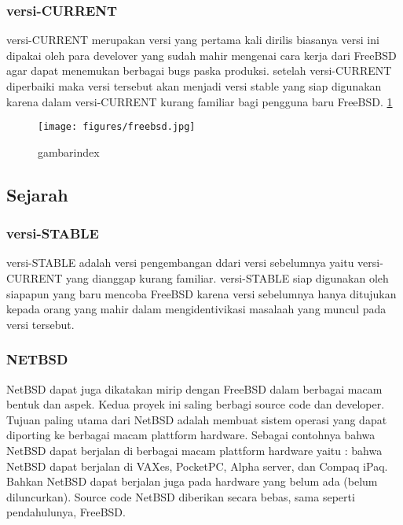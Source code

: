 \subsubsection{versi-CURRENT}
	versi-CURRENT merupakan versi yang pertama kali dirilis biasanya versi ini dipakai oleh para develover yang sudah mahir mengenai
	cara kerja dari FreeBSD agar dapat menemukan berbagai bugs paska produksi. setelah versi-CURRENT diperbaiki maka versi tersebut
	akan menjadi versi stable yang siap digunakan karena dalam versi-CURRENT kurang familiar bagi pengguna baru FreeBSD.
	\ref{freebsd} 
	\begin{figure} [ht]
	\centerline{\texttt{[image: figures/freebsd.jpg]}}
	\caption{gambarindex}
	\label {freebsd}
	\end {figure}
\subsection{Sejarah}
\subsubsection{versi-STABLE}
	versi-STABLE adalah versi pengembangan ddari versi sebelumnya yaitu versi-CURRENT yang dianggap kurang familiar.
	versi-STABLE siap digunakan oleh siapapun yang baru mencoba FreeBSD karena versi sebelumnya hanya ditujukan kepada
	orang yang mahir dalam mengidentivikasi masalaah yang muncul pada versi tersebut.
\subsubsection{NETBSD}
	NetBSD dapat juga dikatakan mirip dengan FreeBSD dalam berbagai macam bentuk dan aspek. Kedua proyek ini saling berbagi source code dan developer. 
	Tujuan paling utama dari NetBSD adalah membuat sistem operasi yang dapat diporting ke berbagai macam plattform hardware. 
	Sebagai contohnya bahwa NetBSD dapat berjalan di berbagai macam plattform hardware yaitu : bahwa NetBSD dapat berjalan di VAXes, PocketPC, Alpha server, dan Compaq iPaq. Bahkan NetBSD dapat berjalan juga pada hardware yang belum ada (belum diluncurkan). 
	Source code NetBSD diberikan secara bebas, sama seperti pendahulunya, FreeBSD.
